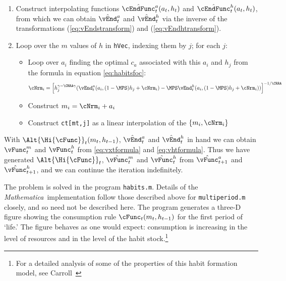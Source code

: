 \documentclass[titlepage, headings=optiontotocandhead]{\econtex}
\newcommand{\Mma}{\textit{Mathematica}}
\begin{document}
{\begin{enumerate}
  \item Construct interpolating functions $\hat{\cEndFunc}^{a}_{t}({a}_{t},h_{t})$
    and $\hat{\cEndFunc}^{h}_{t}({a}_{t},h_{t})$, from which we can
    obtain $\hat{\vEnd}^{a}_{t}$ and $\hat{\vEnd}^{h}_{t}$
    via the inverse of the transformations (\ref{eq:vEndstransform})
    and (\ref{eq:vEndhtransform}).

  \item Loop over the $m$ values of $h$ in \texttt{hVec}, indexing them
    by $j$; for each $j$:
    \begin{itemize}
    \item Loop over ${a}_{i}$ finding the optimal ${c}_{a}$ associated
      with this ${a}_{i}$ and $h_{j}$ from the formula in equation
      \eqref{eq:habitsfoc}:
      \begin{equation}
        {\cNrm}_{i} = \left[h_{j}^{\gamma-\CRRA \gamma}
          (\vEnd_{t}^{{a}}({a}_{i},(1-\MPS) h_{j}+ {\cNrm}_{i})
          -\MPS \vEnd_{t}^{h}({a}_{i},(1-\MPS)
          h_{j}+{\cNrm}_{i}))\right]^{-1/\CRRA} \nonumber
      \end{equation}

    \item Construct ${m}_{i} = {\cNrm}_{i}+{a}_{i}$

    \item Construct \texttt{ct[mt,j]} as a linear interpolation of the
      $\{{m}_{i},{\cNrm}_{i}\}$
    \end{itemize}
  \end{enumerate}

  With $\Alt{\Hi{\cFunc}}_{t}({m}_{t},h_{t-1})$, $\hat{\vEnd}_{t}^{{a}}$
  and $\hat{\vEnd}_{t}^{h}$ in hand we can obtain ${\vFunc}^{m}_{t}$
  and ${\vFunc}^{h}_{t}$ from \eqref{eq:vxtformula} and
  \eqref{eq:vhtformula}. Thus we have generated $\Alt{\Hi{\cFunc}}_{t}$,
  $\hat{\vFunc}^{m}_{t}$ and $\hat{\vFunc}^{h}_{t}$ from $\hat{\vFunc}^{a}_{t+1}$ and
  $\hat{\vFunc}^{h}_{t+1}$, and we can continue the iteration indefinitely.

  The problem is solved in the program \texttt{habits.m}.  Details of
  the {\Mma}~implementation follow those described above for
  \texttt{multiperiod.m} closely, and so need not be described here.
  The program generates a three-D figure showing the consumption rule
  $\cFunc_{t}({m}_{t},h_{t-1})$ for the first period of `life.'  The figure
  behaves as one would expect: consumption is increasing in the level
  of resources and in the level of the habit stock.\footnote{For a
    detailed analysis of some of the properties of this habit formation
    model, see Carroll~\citeyearpar{carroll:RiskyHabits}}


}{}
\end{document}

